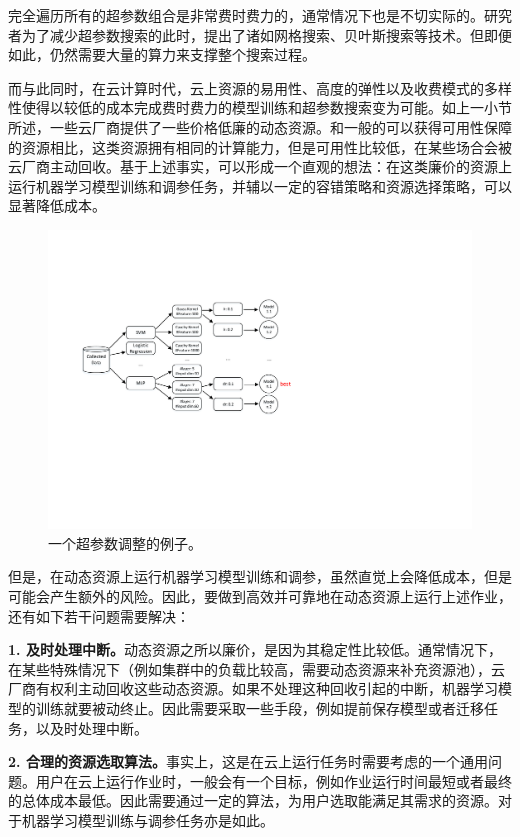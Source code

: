 完全遍历所有的超参数组合是非常费时费力的，通常情况下也是不切实际的。研究者为了减少超参数搜索的此时，提出了诸如网格搜索、贝叶斯搜索等技术。但即便如此，仍然需要大量的算力来支撑整个搜索过程。

而与此同时，在云计算时代，云上资源的易用性、高度的弹性以及收费模式的多样性使得以较低的成本完成费时费力的模型训练和超参数搜索变为可能。如上一小节所述，一些云厂商提供了一些价格低廉的动态资源。和一般的可以获得可用性保障的资源相比，这类资源拥有相同的计算能力，但是可用性比较低，在某些场合会被云厂商主动回收。基于上述事实，可以形成一个直观的想法：在这类廉价的资源上运行机器学习模型训练和调参任务，并辅以一定的容错策略和资源选择策略，可以显著降低成本。

\begin{figure}[h]
    \centerline{\includegraphics[width=\textwidth]{figures/hpt.pdf}}
    \caption{一个超参数调整的例子。}
    \label{hpt_example}
\end{figure}

但是，在动态资源上运行机器学习模型训练和调参，虽然直觉上会降低成本，但是可能会产生额外的风险。因此，要做到高效并可靠地在动态资源上运行上述作业，还有如下若干问题需要解决：

\textbf{1. 及时处理中断。}动态资源之所以廉价，是因为其稳定性比较低。通常情况下，在某些特殊情况下（例如集群中的负载比较高，需要动态资源来补充资源池），云厂商有权利主动回收这些动态资源。如果不处理这种回收引起的中断，机器学习模型的训练就要被动终止。因此需要采取一些手段，例如提前保存模型或者迁移任务，以及时处理中断。

\textbf{2. 合理的资源选取算法。}事实上，这是在云上运行任务时需要考虑的一个通用问题。用户在云上运行作业时，一般会有一个目标，例如作业运行时间最短或者最终的总体成本最低。因此需要通过一定的算法，为用户选取能满足其需求的资源。对于机器学习模型训练与调参任务亦是如此。

